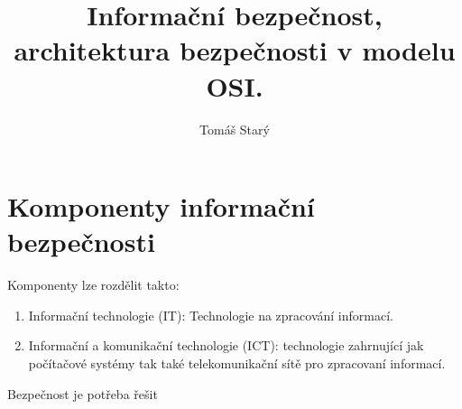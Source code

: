 \documentclass{szzclass}
\title{Informační bezpečnost, architektura bezpečnosti v modelu OSI.}
\author{Tomáš Starý}
\begin{document}
\section{Komponenty informační bezpečnosti}

Komponenty lze rozdělit takto:
\begin{enumerate}
    \item Informační technologie (IT): Technologie na zpracování informací.
    \item Informační a komunikační technologie (ICT): technologie zahrnující jak počítačové systémy
    tak také telekomunikační sítě pro zpracovaní informací.
\end{enumerate}

Bezpečnost je potřeba řešit
\end{document}

